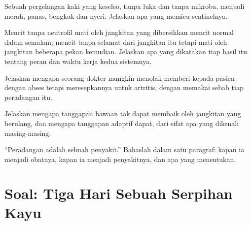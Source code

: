 \begin{exercise}[$\star\star$]\label{exo:g12:innate-immunity:11}
Sebuah pergelangan kaki yang keseleo, tanpa luka dan tanpa mikroba,
menjadi merah, panas, bengkak dan nyeri. Jelaskan apa yang memicu 
sentinelnya.
\end{exercise}

\begin{exercise}[$\star\star\star$]\label{exo:g12:innate-immunity:12}
Mencit tanpa neutrofil mati oleh jangkitan yang dibersihkan mencit
normal dalam semalam; mencit tanpa  selamat dari
jangkitan itu tetapi mati oleh jangkitan beberapa pekan kemudian.
Jelaskan apa yang dikatakan tiap hasil itu tentang peran dan waktu
kerja kedua sistemnya.
\end{exercise}

\begin{exercise}[$\star\star\star$]\label{exo:g12:innate-immunity:13}
Jelaskan mengapa seorang dokter mungkin menolak memberi 
kepada pasien dengan abses tetapi meresepkannya untuk artritis, dengan
memakai sebab tiap peradangan itu.
\end{exercise}

\begin{exercise}[$\star\star\star$]\label{exo:g12:innate-immunity:14}
Jelaskan mengapa tanggapan bawaan tak dapat membaik oleh jangkitan
yang berulang, dan mengapa tanggapan adaptif dapat, dari sifat apa
yang dikenali masing-masing.
\end{exercise}

\begin{exercise}[$\star\star\star$]\label{exo:g12:innate-immunity:15}
``Peradangan adalah sebuah penyakit.'' Bahaslah dalam satu paragraf:
kapan ia menjadi obatnya, kapan ia menjadi penyakitnya, dan apa yang
menentukan.
\end{exercise}

\section{Soal: Tiga Hari Sebuah Serpihan Kayu}

